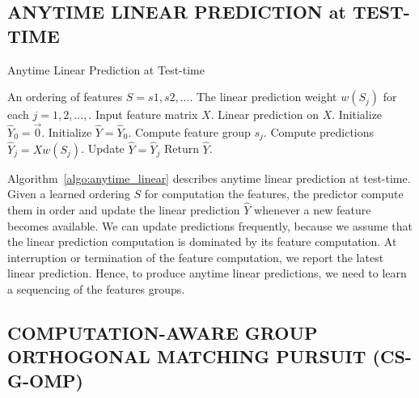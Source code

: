 \subsection{ANYTIME LINEAR PREDICTION at TEST-TIME}

\begin{algorithm}[tb]
\caption{Anytime Linear Prediction at Test-time}
\label{algo:anytime_linear}
\begin{algorithmic}[1]
 An ordering of features $S = s1, s2, ...$. 
The linear prediction weight $w(S_j)$ for each $j=1,2,...,$.
Input feature matrix $X$.
 Linear prediction on $X$.
\STATE Initialize $\hat{Y}_0 = \vec{0}$. 
\STATE Initialize $\hat{Y} = \hat{Y}_0$. 
	\STATE Compute feature group $s_j$.
	\STATE Compute predictions $\hat{Y}_j = Xw(S_j)$.
	\STATE Update $\hat{Y} = \hat{Y}_j$
\ENDFOR
\STATE Return $\hat{Y}$. 
\end{algorithmic}
\end{algorithm}

Algorithm~\ref{algo:anytime_linear} describes anytime linear prediction at test-time. 
Given a learned ordering $S$ for computation the features, the predictor compute them in order
and update the linear prediction $\hat{Y}$ whenever a new feature becomes available. 
We can update predictions frequently, because we assume that the linear prediction computation
is dominated by its feature computation.
At interruption or termination of the feature computation, we report the latest linear prediction. 
Hence, to produce anytime linear predictions, we need to learn a sequencing of the features groups.


\subsection{COMPUTATION-AWARE GROUP ORTHOGONAL MATCHING PURSUIT (CS-G-OMP)}


